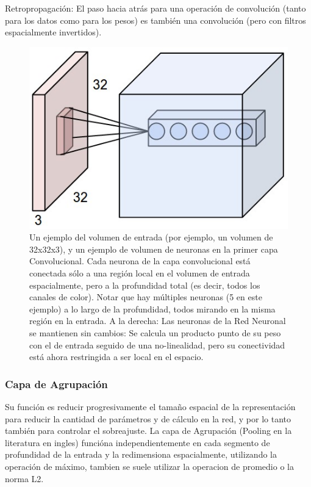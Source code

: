 \documentclass[a4paper,11pt,spanish]{book}
\begin{document}
	Retropropagación: El paso hacia atrás para una operación de convolución (tanto para los datos como para los pesos) es también una convolución (pero con filtros espacialmente invertidos).
	\begin{figure}[H]
	  \includegraphics[scale=0.5]{./img/stanford_conv_layer.jpeg}
	  \caption{Un ejemplo del volumen de entrada (por ejemplo, un volumen de 32x32x3), y un ejemplo de volumen de neuronas en la primer capa Convolucional.
	    Cada neurona de la capa convolucional está conectada sólo a una región local en el volumen de entrada espacialmente, pero a la profundidad total (es decir, todos
	    los canales de color). Notar que hay múltiples neuronas (5 en este ejemplo) a lo largo de la profundidad, todos mirando en la misma región en la entrada.
	    A la derecha: Las neuronas de la Red Neuronal se mantienen sin cambios: Se calcula un producto punto de su peso con el de entrada seguido de una no-linealidad,
	    pero su conectividad está ahora restringida a ser local en el espacio.}
	  \label{fig:conv_layer}
	\end{figure}

      \subsubsection{Capa de Agrupación}
	Su función es reducir progresivamente el tamaño espacial de la representación para reducir la cantidad de parámetros y de cálculo en la red, y por lo tanto también para controlar
	el sobreajuste. La capa de Agrupación (Pooling en la literatura en ingles) funcióna independientemente en cada segmento de profundidad de la entrada y la redimensiona espacialmente, utilizando la operación de máximo,
	tambien se suele utilizar la operacion de promedio o la norma L2.\\
\end{document}
